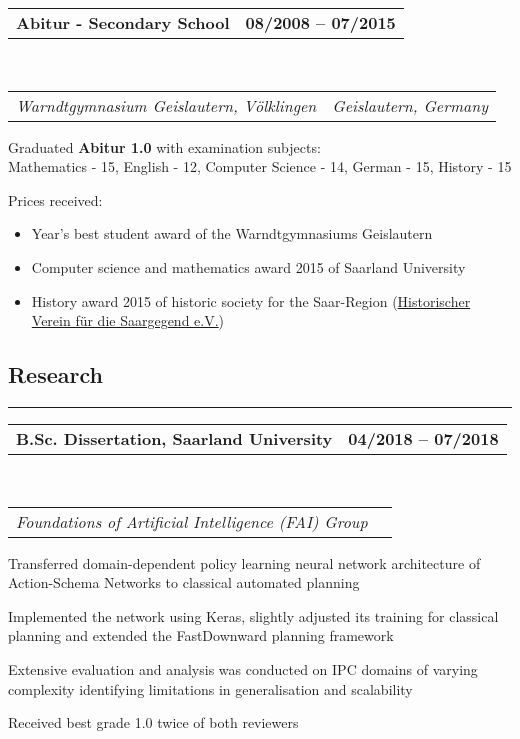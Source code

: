 \documentclass[10pt,letterpaper]{article}
\makeatletter
\newcommand{\headerrow}[2]
{\begin{tabular*}{\linewidth}{l@{\extracolsep{\fill}}r}
	#1 &
	#2 \\
\end{tabular*}}
\makeatother
\begin{document}
\vspace{0.4em}

\noindent
\headerrow{\textbf{Abitur - Secondary School}}{\textbf{08/2008 -- 07/2015}}
\\
\headerrow{\emph{Warndtgymnasium Geislautern, Völklingen}}{\emph{Geislautern, Germany}}
\vspace{-1.6em}
\begin{itemize*}
	\item Graduated \textbf{Abitur 1.0} with examination subjects:\\
       Mathematics - 15, English - 12, Computer Science - 14, German - 15, History - 15
    \item Prices received:
    \vspace{-0.3em}
    \begin{itemize}
        \setlength\itemsep{0em}
        \item Year's best student award of the Warndtgymnasiums Geislautern
        \item Computer science and mathematics award 2015 of Saarland University
        \item History award 2015 of historic society for the Saar-Region (\href{https://www.hvsaargegend.de/}{Historischer Verein für die Saargegend e.V.})
    \end{itemize}
\end{itemize*}

\subsection*{Research}
\hrule
\vspace{0.4em}

\noindent
\headerrow{\textbf{B.Sc. Dissertation, Saarland University}}{\textbf{04/2018 -- 07/2018}}
\\
\headerrow{\emph{Foundations of Artificial Intelligence (FAI) Group}}{}
\vspace{-1.6em}
\begin{itemize*}
    \item Transferred domain-dependent policy learning neural network architecture of Action-Schema Networks to
    classical automated planning
    \item Implemented the network using Keras, slightly adjusted its training for classical planning and extended 
    the FastDownward planning framework
    \item Extensive evaluation and analysis was conducted on IPC domains of varying complexity identifying
    limitations in generalisation and scalability
    \item Received best grade 1.0 twice of both reviewers
\end{itemize*}
\end{document}

